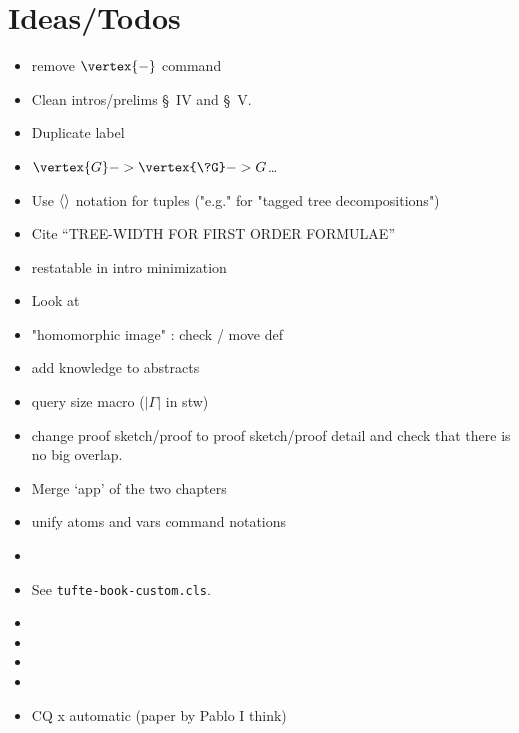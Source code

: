 \chapter*{Ideas/Todos}

\begin{itemize}
	\item remove $\vertex{-}$ command
	\item Clean intros/prelims \S~IV and \S~V.
	\item Duplicate label
	\item $\vertex{G} -> \vertex{\?G} -> G$…
	\item Use $\langle\rangle$ notation for tuples ("e.g." for "tagged tree decompositions")
	\item Cite ``TREE-WIDTH FOR FIRST ORDER FORMULAE''
	\item restatable in intro minimization
	\item Look at \cite{ChenGottlobLanzingerPichler2020Semantic}
	\item "homomorphic image" : check / move def
	\item add knowledge to abstracts
	\item query size macro ($|\Gamma|$ in stw)
	\item change proof sketch/proof to proof sketch/proof detail and check
		that there is no big overlap.
	\item Merge `app' of the two chapters
	\item unify atoms and vars command notations
	\item {}
	\item {}
		See \texttt{tufte-book-custom.cls}.
	\item {}
	\item {}
	\item {}
	\item {}
	\item CQ x automatic (paper by Pablo I think)
\end{itemize}

